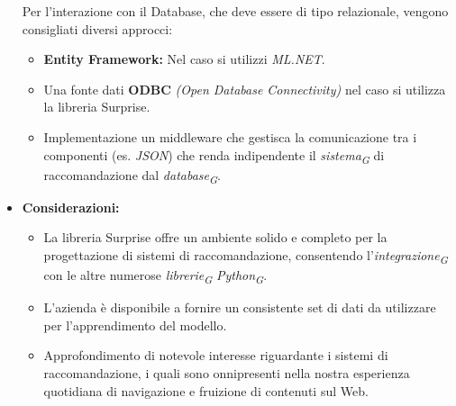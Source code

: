 \documentclass{article}
\begin{document}
\begin{itemize}
    Per l'interazione con il Database, che deve essere di tipo relazionale, vengono consigliati diversi approcci: 
        
    \begin{itemize}
    \item \textbf{Entity Framework:} Nel caso si utilizzi \textit{ML.NET}.
    \item Una fonte dati \textbf{ODBC} \textit{(Open Database Connectivity)} nel caso si utilizza la libreria Surprise.
    \item Implementazione un middleware che gestisca la comunicazione tra i componenti (es. \textit{JSON}) che renda indipendente il \textit{sistema}\textsubscript{\textit{G}} di raccomandazione dal \textit{database}\textsubscript{\textit{G}}.

    \end{itemize}
    
    \item[] \textbf{Considerazioni:}
    \begin{itemize}
        \item La libreria Surprise offre un ambiente solido e completo per la progettazione di sistemi di raccomandazione, consentendo l’\textit{integrazione}\textsubscript{\textit{G}} con le altre numerose \textit{librerie}\textsubscript{\textit{G}} \textit{Python}\textsubscript{\textit{G}}.
        \item L’azienda è disponibile a fornire un consistente set di dati da utilizzare per l’apprendimento del modello.
        \item Approfondimento di notevole interesse riguardante i sistemi di raccomandazione, i quali sono onnipresenti nella nostra esperienza quotidiana di navigazione e fruizione di contenuti sul Web.
    \end{itemize} 

\end{itemize}
\pagebreak

\end{document}
